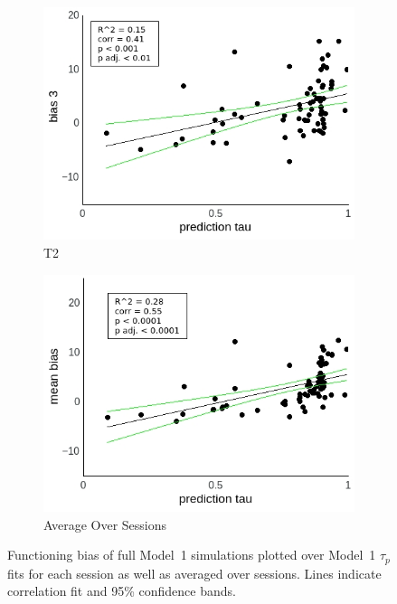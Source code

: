 \documentclass[a4paper]{scrreprt}
\begin{document}
\begin{figure}
\begin{subfigure}[b]{0.49\textwidth}
        \includegraphics[width=\textwidth]{figs/sec3/pred/pred_diff_3_mod1mod1.jpeg}
        \caption{T2}
    \end{subfigure}
    \begin{subfigure}[b]{0.49\textwidth}
        \includegraphics[width=\textwidth]{figs/sec3/pred/pred_diff_mean_mod1mod1.jpeg}
        \caption{Average Over Sessions}
    \end{subfigure}
\caption{Functioning bias of full Model~1 simulations plotted over Model~1 $\tau_p$ fits for each session as well as averaged over sessions. Lines indicate correlation fit and 95\% confidence bands.}
\label{fig:pred_diff_mod1mod1}
\end{figure}
\end{document}
